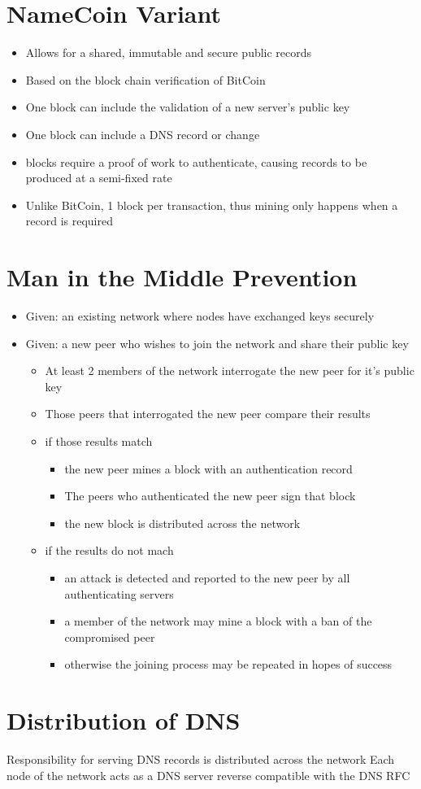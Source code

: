 \documentclass{IEEEtran}
\begin{document}
\section{NameCoin Variant}
\begin{itemize}
\item{Allows for a shared, immutable and secure public records}
\item{Based on the block chain verification of BitCoin}
\item{One block can include the validation of a new server's public key}
\item{One block can include a DNS record or change}
\item{blocks require a proof of work to authenticate, causing records to be produced at a semi-fixed rate}
\item{Unlike BitCoin, 1 block per transaction, thus mining only happens when a record is required}
\end{itemize}

\section{Man in the Middle Prevention}
\begin{itemize}
        \item{Given: an existing network where nodes have exchanged keys securely}
        \item{Given: a new peer who wishes to join the network and share their public key}
        \begin{itemize}
                \item{At least 2 members of the network interrogate the new peer for it's public key}
                \item{Those peers that interrogated the new peer compare their results}
                \item{if those results match}
                \begin{itemize}
                        \item{the new peer mines a block with an authentication record}
                        \item{The peers who authenticated the new peer sign that block}
                        \item{the new block is distributed across the network}
                \end{itemize}
                \item{if the results do not mach}
                \begin{itemize}
                        \item{an attack is detected and reported to the new peer by all authenticating servers}
                        \item{a member of the network may mine a block with a ban of the compromised peer}
                        \item{otherwise the joining process may be repeated in hopes of success}
                \end{itemize}
        \end{itemize}
\end{itemize}


\section{Distribution of DNS}
Responsibility for serving DNS records is distributed across the network
Each node of the network acts as a DNS server reverse compatible with the DNS RFC
\end{document}

